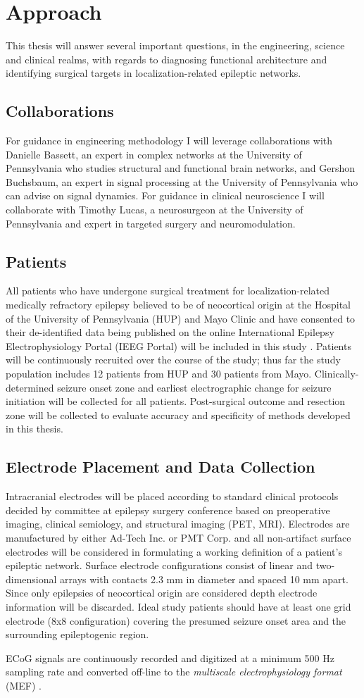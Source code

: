 \section{Approach}
This thesis will answer several important questions, in the engineering, science and clinical realms, with regards to diagnosing functional architecture and identifying surgical targets in localization-related epileptic networks.

\subsection{Collaborations}
For guidance in engineering methodology I will leverage collaborations with Danielle Bassett, an expert in complex networks at the University of Pennsylvania who studies structural and functional brain networks, and Gershon Buchsbaum, an expert in signal processing at the University of Pennsylvania who can advise on signal dynamics. For guidance in clinical neuroscience I will collaborate with Timothy Lucas, a neurosurgeon at the University of Pennsylvania and expert in targeted surgery and neuromodulation.

\subsection{Patients}
All patients who have undergone surgical treatment for localization-related medically refractory epilepsy believed to be of neocortical origin at the Hospital of the University of Pennsylvania (HUP) and Mayo Clinic and have consented to their de-identified data being published on the online International Epilepsy Electrophysiology Portal (IEEG Portal) will be included in this study \cite{wagenaar2013multimodal}. Patients will be continuously recruited over the course of the study; thus far the study population includes 12 patients from HUP and 30 patients from Mayo. Clinically-determined seizure onset zone and earliest electrographic change for seizure initiation will be collected for all patients. Post-surgical outcome and resection zone will be collected to evaluate accuracy and specificity of methods developed in this thesis.

\subsection{Electrode Placement and Data Collection}
Intracranial electrodes will be placed according to standard clinical protocols decided by committee at epilepsy surgery conference based on preoperative imaging, clinical semiology, and structural imaging (PET, MRI). Electrodes are manufactured by either Ad-Tech Inc. or PMT Corp. and all non-artifact surface electrodes will be considered in formulating a working definition of a patient's epileptic network. Surface electrode configurations consist of linear and two-dimensional arrays with contacts 2.3 mm in diameter and spaced 10 mm apart. Since only epilepsies of neocortical origin are considered depth electrode information will be discarded. Ideal study patients should have at least one grid electrode (8x8 configuration) covering the presumed seizure onset area and the surrounding epileptogenic region.

ECoG signals are continuously recorded and digitized at a minimum 500 Hz sampling rate and converted off-line to the \textit{multiscale electrophysiology format} (MEF) \cite{brinkmann2009large-scale}.
